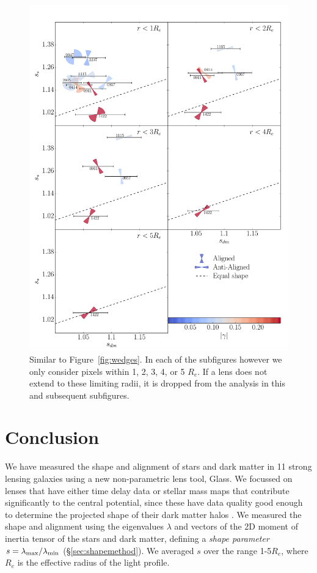 \documentclass[useAMS,usenatbib]{mn2e}
\def\Glass{{\sc Glass}}
\begin{document}
\begin{figure}
  \centering
  \includegraphics[width=.8\linewidth]{Figures/wedges.pdf}
  \caption[width=.65\linewidth]{Similar to Figure~\ref{fig:wedges}. In each of the subfigures however we only consider pixels within 1, 2, 3, 4, or 5 $R_e$. If a lens does not extend to these limiting radii, it is dropped from the analysis in this and subsequent subfigures.}
  \label{fig:wedgesall}
\end{figure}


\section{Conclusion}\label{sec:conclusions}

We have measured the shape and alignment of stars and dark matter in 11 strong lensing galaxies using a new non-parametric lens tool, \Glass. We focussed on lenses that have either time delay data or stellar mass maps that contribute significantly to the central potential, since these have data quality good enough to determine the projected shape of their dark matter halos \citep{2014arXiv1401.7990C}. We measured the shape and alignment using the eigenvalues $\lambda$ and vectors of the 2D moment of inertia tensor of the stars and dark matter, defining a {\it shape parameter} $s = \lambda_{\rm max}/\lambda_{\rm min}$ (\S\ref{sec:shapemethod}). We averaged $s$ over the range 1-5$R_e$, where $R_e$ is the effective radius of the light profile.
\end{document}
